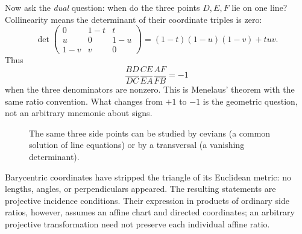 Now ask the \emph{dual} question: when do the three points \(D,E,F\) lie on one line? Collinearity means the determinant of their coordinate triples is zero:
\[
 \det\begin{pmatrix}
 0&1-t&t\\
 u&0&1-u\\
 1-v&v&0
 \end{pmatrix}
 =(1-t)(1-u)(1-v)+tuv.
\]
Thus
\[
 \boxed{\frac{BD}{DC}\frac{CE}{EA}\frac{AF}{FB}=-1}
\]
when the three denominators are nonzero. This is Menelaus' theorem with the same ratio convention. What changes from \(+1\) to \(-1\) is the geometric question, not an arbitrary mnemonic about signs.

\begin{figure}[H]
\centering
{}
\caption{The same three side points can be studied by cevians (a common solution of line equations) or by a transversal (a vanishing determinant).}
\end{figure}

Barycentric coordinates have stripped the triangle of its Euclidean metric: no lengths, angles, or perpendiculars appeared. The resulting statements are projective incidence conditions. Their expression in products of ordinary side ratios, however, assumes an affine chart and directed coordinates; an arbitrary projective transformation need not preserve each individual affine ratio.

